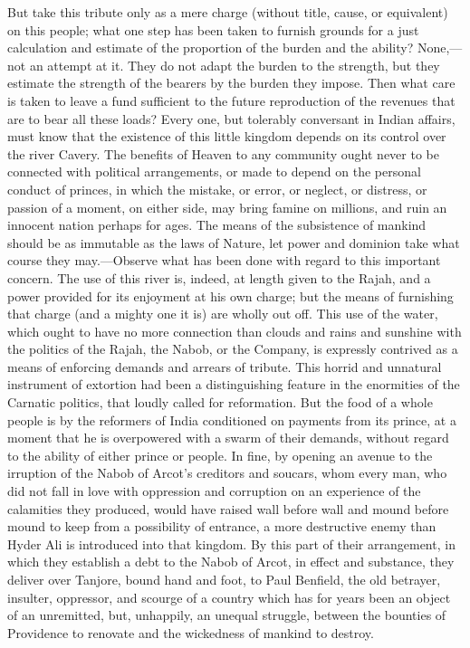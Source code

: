 But take this tribute only as a mere charge (without title, cause, or equivalent) on this people; what one step has been taken to furnish grounds for a just calculation and estimate of the proportion of the burden and the ability? None,—not an attempt at it. They do not adapt the burden to the strength, but they estimate the strength of the bearers by the burden they impose. Then what care is taken to leave a fund sufficient to the future reproduction of the revenues that are to bear all these loads? Every one, but tolerably conversant in Indian affairs, must know that the existence of this little kingdom depends on its control over the river Cavery. The benefits of Heaven to any community ought never to be connected with political arrangements, or made to depend on the personal conduct of princes, in which the mistake, or error, or neglect, or distress, or passion of a moment, on either side, may bring famine on millions, and ruin an innocent nation perhaps for ages. The means of the subsistence of mankind should be as immutable as the laws of Nature, let power and dominion take what course they may.—Observe what has been done with regard to this important concern. The use of this river is, indeed, at length given to the Rajah, and a power provided for its enjoyment at his own charge; but the means of furnishing that charge (and a mighty one it is) are wholly out off. This use of the water, which ought to have no more connection than clouds and rains and sunshine with the politics of the Rajah, the Nabob, or the Company, is expressly contrived as a means of enforcing demands and arrears of tribute. This horrid and unnatural instrument of extortion had been a distinguishing feature in the enormities of the Carnatic politics, that loudly called for reformation. But the food of a whole people is by the reformers of India conditioned on payments from its prince, at a moment that he is overpowered with a swarm of their demands, without regard to the ability of either prince or people. In fine, by opening an avenue to the irruption of the Nabob of Arcot's creditors and soucars, whom every man, who did not fall in love with oppression and corruption on an experience of the calamities they produced, would have raised wall before wall and mound before mound to keep from a possibility of entrance, a more destructive enemy than Hyder Ali is introduced into that kingdom. By this part of their arrangement, in which they establish a debt to the Nabob of Arcot, in effect and substance, they deliver over Tanjore, bound hand and foot, to Paul Benfield, the old betrayer, insulter, oppressor, and scourge of a country which has for years been an object of an unremitted, but, unhappily, an unequal struggle, between the bounties of Providence to renovate and the wickedness of mankind to destroy.

